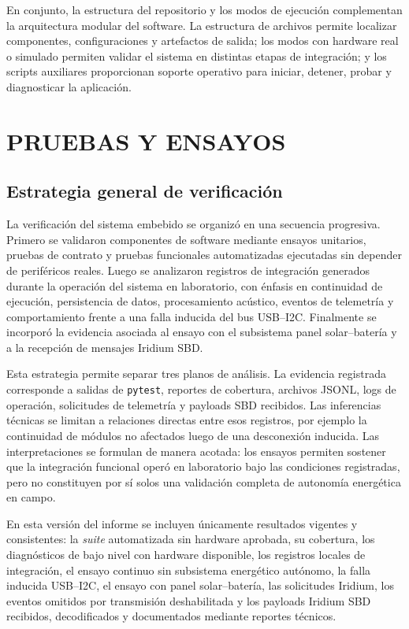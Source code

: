En conjunto, la estructura del repositorio y los modos de ejecución complementan la arquitectura modular del software. La estructura de archivos permite localizar componentes, configuraciones y artefactos de salida; los modos con hardware real o simulado permiten validar el sistema en distintas etapas de integración; y los scripts auxiliares proporcionan soporte operativo para iniciar, detener, probar y diagnosticar la aplicación.


\clearpage
\section{PRUEBAS Y ENSAYOS}
\label{sec:pruebas_ensayos}

\subsection{Estrategia general de verificación}

La verificación del sistema embebido se organizó en una secuencia progresiva. Primero se validaron componentes de software mediante ensayos unitarios, pruebas de contrato y pruebas funcionales automatizadas ejecutadas sin depender de periféricos reales. Luego se analizaron registros de integración generados durante la operación del sistema en laboratorio, con énfasis en continuidad de ejecución, persistencia de datos, procesamiento acústico, eventos de telemetría y comportamiento frente a una falla inducida del bus USB--I2C. Finalmente se incorporó la evidencia asociada al ensayo con el subsistema panel solar--batería y a la recepción de mensajes Iridium SBD.

Esta estrategia permite separar tres planos de análisis. La evidencia registrada corresponde a salidas de \texttt{pytest}, reportes de cobertura, archivos JSONL, logs de operación, solicitudes de telemetría y payloads SBD recibidos. Las inferencias técnicas se limitan a relaciones directas entre esos registros, por ejemplo la continuidad de módulos no afectados luego de una desconexión inducida. Las interpretaciones se formulan de manera acotada: los ensayos permiten sostener que la integración funcional operó en laboratorio bajo las condiciones registradas, pero no constituyen por sí solos una validación completa de autonomía energética en campo.

En esta versión del informe se incluyen únicamente resultados vigentes y consistentes: la \textit{suite} automatizada sin hardware aprobada, su cobertura, los diagnósticos de bajo nivel con hardware disponible, los registros locales de integración, el ensayo continuo sin subsistema energético autónomo, la falla inducida USB--I2C, el ensayo con panel solar--batería, las solicitudes Iridium, los eventos omitidos por transmisión deshabilitada y los payloads Iridium SBD recibidos, decodificados y documentados mediante reportes técnicos.


